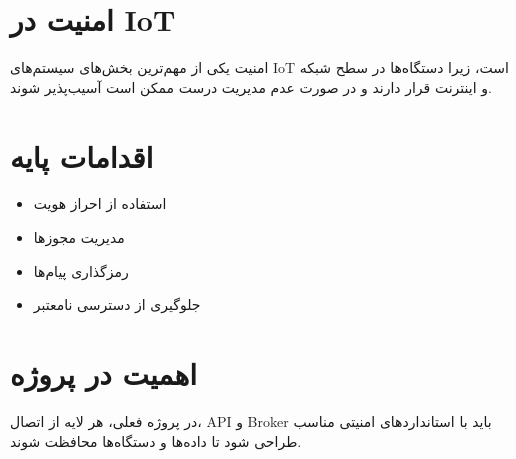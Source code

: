 \section{امنیت در IoT}

امنیت یکی از مهم‌ترین بخش‌های سیستم‌های IoT است، زیرا دستگاه‌ها در سطح شبکه و اینترنت قرار دارند و در صورت عدم مدیریت درست ممکن است آسیب‌پذیر شوند.

\section{اقدامات پایه}

\begin{itemize}
    \item استفاده از احراز هویت
    \item مدیریت مجوزها
    \item رمزگذاری پیام‌ها
    \item جلوگیری از دسترسی نامعتبر
\end{itemize}

\section{اهمیت در پروژه}

در پروژه فعلی، هر لایه از اتصال، API و Broker باید با استانداردهای امنیتی مناسب طراحی شود تا داده‌ها و دستگاه‌ها محافظت شوند.
